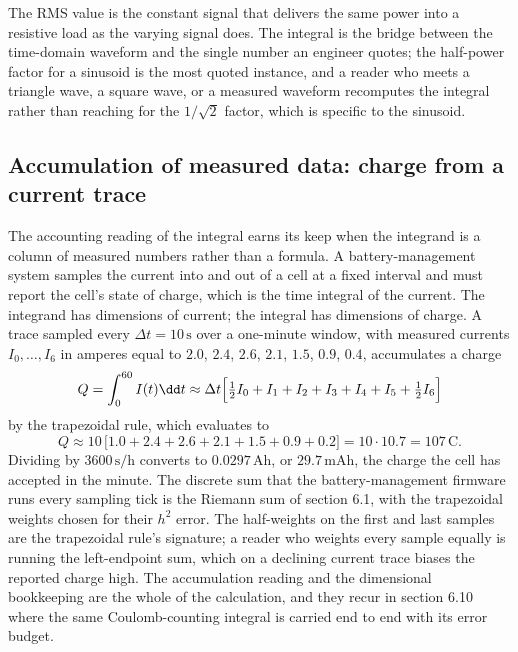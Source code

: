 

The RMS value is the constant signal that delivers the same power
into a resistive load as the varying signal does. The integral is
the bridge between the time-domain waveform and the single number an
engineer quotes; the half-power factor for a sinusoid is the most
quoted instance, and a reader who meets a triangle wave, a square
wave, or a measured waveform recomputes the integral rather than
reaching for the $1/\sqrt{2}$ factor, which is specific to the
sinusoid.

\subsection{Accumulation of measured data: charge from a current
trace}

The accounting reading of the integral earns its keep when the
integrand is a column of measured numbers rather than a formula. A
battery-management system samples the current into and out of a cell
at a fixed interval and must report the cell's state of charge, which
is the time integral of the current. The integrand has dimensions of
current; the integral has dimensions of charge. A trace sampled every
$\Delta t = 10\,\si{\second}$ over a one-minute window, with measured
currents $I_{0}, \ldots, I_{6}$ in amperes equal to $2.0$, $2.4$,
$2.6$, $2.1$, $1.5$, $0.9$, $0.4$, accumulates a charge
\[
Q = \int_{0}^{60} I(t)\dd t \approx \Delta t\Bigl[\tfrac{1}{2}I_{0}
+ I_{1} + I_{2} + I_{3} + I_{4} + I_{5} + \tfrac{1}{2}I_{6}\Bigr]
\]
by the trapezoidal rule, which evaluates to
\[
Q \approx 10\,\bigl[1.0 + 2.4 + 2.6 + 2.1 + 1.5 + 0.9 + 0.2\bigr]
= 10 \cdot 10.7 = 107\,\si{\coulomb}.
\]
Dividing by $3600\,\si{\second\per\hour}$ converts to
$0.0297\,\si{\ampere\hour}$, or $29.7\,\si{\milli\ampere\hour}$, the
charge the cell has accepted in the minute. The discrete sum that the
battery-management firmware runs every sampling tick is the Riemann
sum of section 6.1, with the trapezoidal weights chosen for their
$h^{2}$ error. The half-weights on the first and last samples are the
trapezoidal rule's signature; a reader who weights every sample
equally is running the left-endpoint sum, which on a declining current
trace biases the reported charge high. The accumulation reading and
the dimensional bookkeeping are the whole of the calculation, and they
recur in section 6.10 where the same Coulomb-counting integral is
carried end to end with its error budget.

